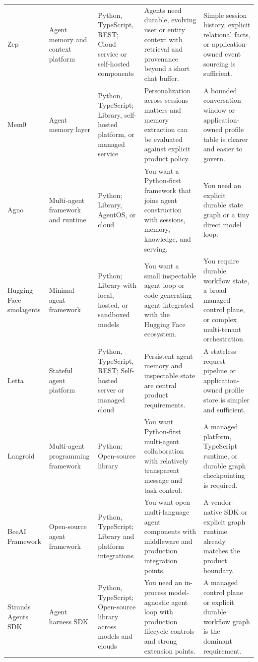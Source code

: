 \begin{longtable}{@{}p{20mm}p{22mm}p{26mm}p{46mm}p{46mm}@{}}
Zep & Agent memory and context platform & Python, TypeScript, REST; Cloud service or self-hosted components & Agents need durable, evolving user or entity context with retrieval and provenance beyond a short chat buffer. & Simple session history, explicit relational facts, or application-owned event sourcing is sufficient.\\
Mem0 & Agent memory layer & Python, TypeScript; Library, self-hosted platform, or managed service & Personalization across sessions matters and memory extraction can be evaluated against explicit product policy. & A bounded conversation window or application-owned profile table is clearer and easier to govern.\\
Agno & Multi-agent framework and runtime & Python; Library, AgentOS, or cloud & You want a Python-first framework that joins agent construction with sessions, memory, knowledge, and serving. & You need an explicit durable state graph or a tiny direct model loop.\\
Hugging Face smolagents & Minimal agent framework & Python; Library with local, hosted, or sandboxed models & You want a small inspectable agent loop or code-generating agent integrated with the Hugging Face ecosystem. & You require durable workflow state, a broad managed control plane, or complex multi-tenant orchestration.\\
Letta & Stateful agent platform & Python, TypeScript, REST; Self-hosted server or managed cloud & Persistent agent memory and inspectable state are central product requirements. & A stateless request pipeline or application-owned profile store is simpler and sufficient.\\
Langroid & Multi-agent programming framework & Python; Open-source library & You want Python-first multi-agent collaboration with relatively transparent message and task control. & A managed platform, TypeScript runtime, or durable graph checkpointing is required.\\
BeeAI Framework & Open-source agent framework & Python, TypeScript; Library and platform integrations & You want open multi-language agent components with middleware and production integration points. & A vendor-native SDK or explicit graph runtime already matches the product boundary.\\
Strands Agents SDK & Agent harness SDK & Python, TypeScript; Open-source library across models and clouds & You need an in-process model-agnostic agent loop with production lifecycle controls and strong extension points. & A managed control plane or explicit durable workflow graph is the dominant requirement.\\

\end{longtable}
